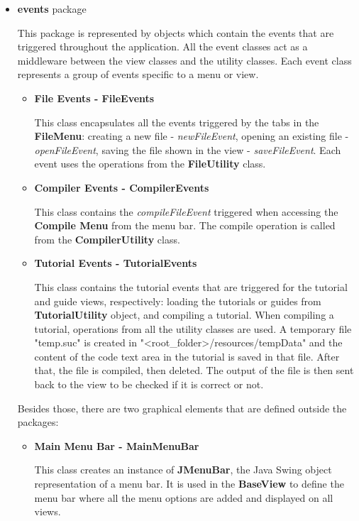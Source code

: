\documentclass[12pt,a4paper,twoside]{report}
\begin{document}
\begin{enumerate}
\begin{itemize}
\begin{itemize}
	\item \textbf{events} package
	
	This package is represented by objects which contain the events that are triggered throughout the application. All the event classes act as a middleware between the view classes and the utility classes. Each event class represents a group of events specific to a menu or view.
	
	\begin{itemize}
		\item \textbf{File Events - FileEvents}
		
		This class encapsulates all the events triggered by the tabs in the \textbf{FileMenu}: creating a new file - \textit{newFileEvent}, opening an existing file - \textit{openFileEvent}, saving the file shown in the view - \textit{saveFileEvent}. Each event uses the operations from the \textbf{FileUtility} class. 
		
		\item \textbf{Compiler Events - CompilerEvents}
		
		This class contains the \textit{compileFileEvent} triggered when accessing the \textbf{Compile Menu} from the menu bar. The compile operation is called from the \textbf{CompilerUtility} class. 
		
		\item \textbf{Tutorial Events - TutorialEvents}
		
		This class contains the tutorial events that are triggered for the tutorial and guide views, respectively: loading the tutorials or guides from \textbf{TutorialUtility} object, and compiling a tutorial. When compiling a tutorial, operations from all the utility classes are used. A temporary file "temp.suc" is created in "<root\_folder>/resources/tempData" and the content of the code text area in the tutorial is saved in that file. After that, the file is compiled, then deleted. The output of the file is then sent back to the view to be checked if it is correct or not.
	\end{itemize}


Besides those, there are two graphical elements that are defined outside the packages:
\begin{itemize}
\item \textbf{Main Menu Bar - MainMenuBar}
	
	This class creates an instance of \textbf{JMenuBar}, the Java Swing object representation of a menu bar. It is used in the \textbf{BaseView} to define the menu bar where all the menu options are added and displayed on all views. 
	

\end{itemize}
\end{itemize}
\end{itemize}
\end{enumerate}
\end{document}
